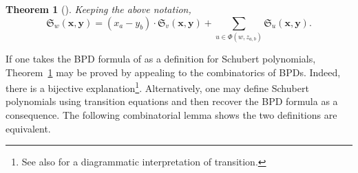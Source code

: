 \documentclass[12pt,reqno]{amsart}
\newtheorem{theorem}{Theorem}[section]
\newtheorem{Main Conjecture}[theorem]{Main Conjecture}
\theoremstyle{remark}
\theoremstyle{plain}
\begin{document}
\begin{theorem}[{\cite[Proposition 4.1]{KV97}}]
	\label{thm:transition}
	Keeping the above notation, \[\mathfrak S_w(\mathbf x, \mathbf y)=(x_a-y_b)\cdot \mathfrak S_v(\mathbf x, \mathbf y)+\sum_{u\in \Phi(w,z_{a,b})}\mathfrak S_u(\mathbf x, \mathbf y).\]
\end{theorem} 

 
If one takes the BPD formula of \cite{LLS21} as a definition for Schubert polynomials, Theorem~\ref{thm:transition} may be proved by appealing to the combinatorics of BPDs.  Indeed, there is a bijective explanation\footnote{See also \cite{KY04} for a diagrammatic interpretation of transition.}. Alternatively, one may define Schubert polynomials using transition equations and then recover the BPD formula as a consequence.  The following combinatorial lemma shows the two definitions are equivalent. 
\end{document}
